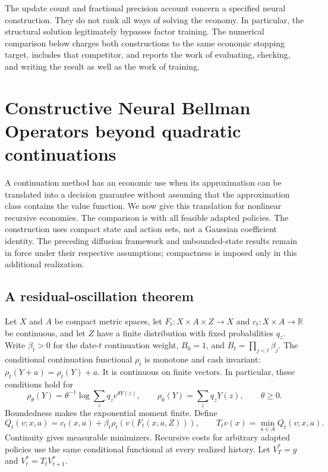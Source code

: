 \documentclass[ecta,nameyear,draft]{econsocart}
\theoremstyle{definition}
\theoremstyle{remark}
\newcommand{\R}{\mathbb R}
\begin{document}
The update count and fractional precision account concern a specified neural
construction. They do not rank all ways of solving the economy. In particular,
the structural solution legitimately bypasses factor training. The numerical
comparison below charges both constructions to the same economic stopping
target, includes that competitor, and reports the work of evaluating, checking,
and writing the result as well as the work of training.

\section{Constructive Neural Bellman Operators beyond quadratic continuations}
\label{sec:r39nonlinear}

A continuation method has an economic use when its approximation can be
translated into a decision guarantee without assuming that the approximation
class contains the value function. We now give this translation for nonlinear
recursive economies. The comparison is with all feasible adapted policies.
The construction uses compact state and action sets, not a Gaussian coefficient
identity. The preceding diffusion framework and unbounded-state results remain
in force under their respective assumptions; compactness is imposed only in
this additional realization.

\subsection{A residual-oscillation theorem}
Let $X$ and $A$ be compact metric spaces, let $F_t:X\times A\times Z\to X$
and $c_t:X\times A\to\R$ be continuous, and let $Z$ have a finite distribution
with fixed probabilities $q_z$. Write $\beta_t>0$ for the date-$t$ continuation
weight, $B_0=1$, and $B_t=\prod_{j<t}\beta_j$. The conditional continuation
functional $\rho_t$ is monotone and cash invariant:
$\rho_t(Y+a)=\rho_t(Y)+a$. It is continuous on finite vectors. In particular,
these conditions hold for
\begin{equation}\label{eq:r39risk}
 \rho_\theta(Y)=\theta^{-1}\log\sum_zq_z e^{\theta Y(z)},\qquad
 \rho_0(Y)=\sum_zq_zY(z),\qquad \theta\geq0.
\end{equation}
Boundedness makes the exponential moment finite. Define
\[
 Q_t(v;x,a)=c_t(x,a)+\beta_t\rho_t(v(F_t(x,a,Z))),\qquad
 T_tv(x)=\min_{a\in A}Q_t(v;x,a).
\]
Continuity gives measurable minimizers. Recursive costs for arbitrary adapted
policies use the same conditional functional at every realized history. Let
$V_T^*=g$ and $V_t^*=T_tV_{t+1}^*$.
\end{document}

